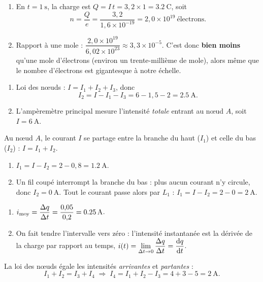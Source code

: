 \documentclass[11pt,a4paper]{article}
\begin{document}
\usetikzlibrary{babel}
\begin{corrige}
\begin{enumerate}[label=\alph*)]
  \item En $t=\qty{1}{\second}$, la charge est $Q=I\,t=3{,}2\times1=\qty{3.2}{\coulomb}$, soit
        \[ n=\frac{Q}{e}=\frac{3{,}2}{1{,}6\times10^{-19}}=2{,}0\times10^{19}\ \text{électrons}. \]
  \item Rapport à une mole : $\dfrac{2{,}0\times10^{19}}{6{,}02\times10^{23}}\approx3{,}3\times10^{-5}$.
        C'est donc \textbf{bien moins} qu'une mole d'électrons (environ un trente-millième de mole),
        alors même que le nombre d'électrons est gigantesque à notre échelle.
\end{enumerate}
\end{corrige}

\begin{corrige}
\begin{enumerate}[label=\alph*)]
  \item Loi des nœuds : $I=I_1+I_2+I_3$, donc
        \[ I_2=I-I_1-I_3=6-1{,}5-2=\qty{2.5}{\ampere}. \]
  \item L'ampèremètre principal mesure l'intensité \emph{totale} entrant au nœud $A$, soit
        $I=\qty{6}{\ampere}$.
\end{enumerate}
\end{corrige}

\begin{corrige}
Au nœud $A$, le courant $I$ se partage entre la branche du haut ($I_1$) et celle du bas ($I_2$) :
$I=I_1+I_2$.
\begin{enumerate}[label=\alph*)]
  \item $I_1=I-I_2=2-0{,}8=\qty{1.2}{\ampere}$.
  \item Un fil coupé interrompt la branche du bas : plus aucun courant n'y circule, donc
        $I_2=\qty{0}{\ampere}$. Tout le courant passe alors par $L_1$ :
        $I_1=I-I_2=2-0=\qty{2}{\ampere}$.
\end{enumerate}
\end{corrige}

\begin{corrige}
\begin{enumerate}[label=\alph*)]
  \item $\displaystyle i_{\text{moy}}=\frac{\Delta q}{\Delta t}=\frac{0{,}05}{0{,}2}=\qty{0.25}{\ampere}$.
  \item On fait tendre l'intervalle vers zéro : l'intensité instantanée est la dérivée de la charge
        par rapport au temps, $i(t)=\displaystyle\lim_{\Delta t\to0}\frac{\Delta q}{\Delta t}=\frac{\mathrm{d}q}{\mathrm{d}t}$.
\end{enumerate}
\end{corrige}

\begin{corrige}
La loi des nœuds égale les intensités \emph{arrivantes} et \emph{partantes} :
\[ I_1+I_2=I_3+I_4 \;\Longrightarrow\; I_4=I_1+I_2-I_3=4+3-5=\qty{2}{\ampere}. \]
\end{corrige}
\end{document}
